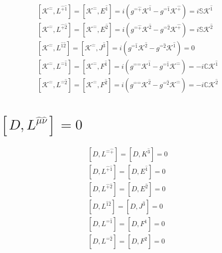 \documentclass[]{article}
\numberwithin{equation}{section}
\begin{document}
\begin{align}
    &\left[\mathcal{K}^{\hat{-}},L^{\hat{+}\hat{1}}\right]=\left[\mathcal{K}^{\hat{-}},E^{\hat{1}}\right]=i\left(g^{\hat{-}\hat{+}}\mathcal{K}^{\hat{1}}-g^{\hat{-}\hat{1}}\mathcal{K}^{\hat{+}}\right)=i\mathbb{S}\mathcal{K}^{\hat{1}}\\
    &\left[\mathcal{K}^{\hat{-}},L^{\hat{+}\hat{2}}\right]=\left[\mathcal{K}^{\hat{-}},E^{\hat{2}}\right]=i\left(g^{\hat{-}\hat{+}}\mathcal{K}^{\hat{2}}-g^{\hat{-}\hat{2}}\mathcal{K}^{\hat{+}}\right)=i\mathbb{S}\mathcal{K}^{\hat{2}}\\
    &\left[\mathcal{K}^{\hat{-}},L^{\hat{1}\hat{2}}\right]=\left[\mathcal{K}^{\hat{-}},J^{\hat{3}}\right]=i\left(g^{\hat{-}\hat{1}}\mathcal{K}^{\hat{2}}-g^{\hat{-}\hat{2}}\mathcal{K}^{\hat{1}}\right)=0\\
    &\left[\mathcal{K}^{\hat{-}},L^{\hat{-}\hat{1}}\right]=\left[\mathcal{K}^{\hat{-}},F^{\hat{1}}\right]=i\left(g^{\hat{-}\hat{-}}\mathcal{K}^{\hat{1}}-g^{\hat{-}\hat{1}}\mathcal{K}^{\hat{-}}\right)=-i\mathbb{C}\mathcal{K}^{\hat{1}}\\
    &\left[\mathcal{K}^{\hat{-}},L^{\hat{-}\hat{2}}\right]=\left[\mathcal{K}^{\hat{-}},F^{\hat{2}}\right]=i\left(g^{\hat{-}\hat{-}}\mathcal{K}^{\hat{2}}-g^{\hat{-}\hat{2}}\mathcal{K}^{\hat{-}}\right)=-i\mathbb{C}\mathcal{K}^{\hat{2}}
\end{align} 

\section{$\left[D, L^{\hat{\mu}\hat{\nu}}\right]=0$}
\begin{align}
  &\left[D, L^{\hat{-}\hat{+}}\right]=\left[D, K^{\hat{3}}\right]=0\\
  &\left[D, L^{\hat{+}\hat{1}}\right]=\left[D, E^{\hat{1}}\right]=0\\
  &\left[D, L^{\hat{+}\hat{2}}\right]=\left[D,E^{\hat{2}}\right]=0\\
  &\left[D, L^{\hat{1}\hat{2}}\right]=\left[D, J^{\hat{3}}\right]=0\\
  &\left[D, L^{\hat{-}\hat{1}}\right]=\left[D, F^{\hat{1}}\right]=0\\
  &\left[D, L^{\hat{-}\hat{2}}\right]=\left[D, F^{\hat{2}}\right]=0
\end{align}
\end{document}
